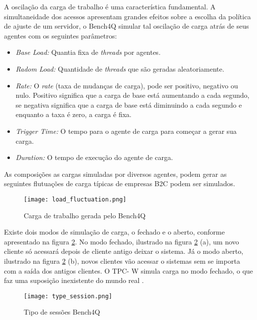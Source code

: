 A oscilação da carga de trabalho é uma característica fundamental. A simultaneidade dos acessos apresentam grandes efeitos sobre a escolha da política de ajuste de um servidor, o Bench4Q simular tal oscilação de carga atrás de seus agentes com os seguintes parâmetros:

\begin{itemize}
	\item \textit{Base Load:} Quantia fixa de \textit{threads} por agentes.
	\item \textit{Radom Load:} Quantidade de \textit{threads} que são geradas aleatoriamente.
	\item \textit{Rate:} O \textit{rate} (taxa de mudanças de carga), pode ser positivo, negativo ou nulo. Positivo significa que a carga de base está aumentando a cada segundo, se negativa significa que a carga de base está diminuindo a cada segundo e enquanto a taxa é zero, a carga é fixa.
	\item \textit{Trigger Time:} O tempo para o agente de carga para começar a gerar sua carga.
	\item \textit{Duration:} O tempo de execução do agente de carga.
\end{itemize}

As composições as cargas simuladas por diversos agentes, podem gerar as seguintes flutuações de carga típicas de empresas B2C podem ser simulados.

\begin{figure}[htb]
	\caption{Carga de trabalho gerada pelo Bench4Q}
	\label{fig:carga-gerada}
	\centering
	\texttt{[image: load\_fluctuation.png]}
\end{figure}


Existe dois modos de simulação de carga, o fechado e o aberto, conforme apresentado na figura \ref{fig:type-session}. No modo fechado, ilustrado na figura \ref{fig:type-session} (a), um novo cliente só acessará depois de cliente antigo deixar o sistema. Já o modo aberto, ilustrado na figura \ref{fig:type-session} (b), novos clientes vão acessar o sistemas sem se importa  com a saída dos antigos clientes. O TPC- W simula carga no modo fechado, o que faz uma suposição inexistente do mundo real \cite{Bench4Q}. 

\begin{figure}[htb]
	\caption{Tipo de sessões Bench4Q}
	\label{fig:type-session}
	\centering
	\texttt{[image: type\_session.png]}
\end{figure}


